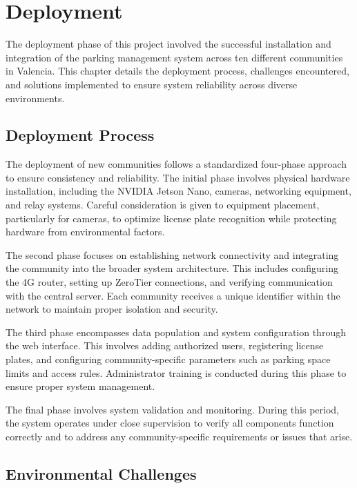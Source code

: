 \chapter{Deployment}\label{ch:deployment}

The deployment phase of this project involved the successful installation and integration of the parking management system across ten different communities in Valencia. This chapter details the deployment process, challenges encountered, and solutions implemented to ensure system reliability across diverse environments. 

\section{Deployment Process}

The deployment of new communities follows a standardized four-phase approach to ensure consistency and reliability. The initial phase involves physical hardware installation, including the NVIDIA Jetson Nano, cameras, networking equipment, and relay systems. Careful consideration is given to equipment placement, particularly for cameras, to optimize license plate recognition while protecting hardware from environmental factors. 

The second phase focuses on establishing network connectivity and integrating the community into the broader system architecture. This includes configuring the 4G router, setting up ZeroTier connections, and verifying communication with the central server. Each community receives a unique identifier within the network to maintain proper isolation and security. 

The third phase encompasses data population and system configuration through the web interface. This involves adding authorized users, registering license plates, and configuring community-specific parameters such as parking space limits and access rules. Administrator training is conducted during this phase to ensure proper system management. 

The final phase involves system validation and monitoring. During this period, the system operates under close supervision to verify all components function correctly and to address any community-specific requirements or issues that arise.

\section{Environmental Challenges}

